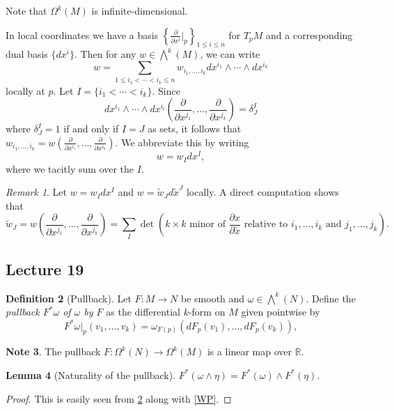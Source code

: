 \documentclass[10pt,letterpaper,cm]{nupset}
\theoremstyle{definition}
\newtheorem{definition}{Definition}[subsection]
\newtheorem{note}[definition]{Note}
\theoremstyle{theorem}
\newtheorem{lemma}[definition]{Lemma}
\theoremstyle{remark}
\newtheorem{remark}[definition]{Remark}
\newcommand{\R}{\mathbb R}
\newcommand{\1}{\mathbf{1}}
\newcommand{\0}{\vec 0}
\begin{document}
Note that $\Omega^k(M)$ is infinite-dimensional. 

\medskip

In local coordinates we have a basis $\left\{\frac{\partial}{\partial{x^i}}\bigr\rvert_p\right\}_{1\leq i \leq n}$ for $T_pM$ and a corresponding dual basis $\{dx^i\}$. Then for any $w \in \bigwedge^k(M)$, we can write $$ w = \sum_{1\leq i_1 < \cdots < i_k \leq n}w_{i_1, \ldots, i_k} dx^{i_1} \wedge \cdots \wedge dx^{i_k} $$ locally at $p$. Let $I =  \{i_1 < \cdots < i_k\}$. Since $$dx^{i_1} \wedge \cdots \wedge dx^{i_l}\left( \frac{\partial}{\partial{x^{j_1}}}, \ldots, \frac{\partial}{\partial{x^{j_k}}} \right) = \delta^I_J$$ where $\delta^I_J = 1$ if and only if $I = J$ as sets, it follows that
$w_{i_1, \ldots, i_k}  = w\left(\frac{\partial}{\partial{x^{i_1}}}, \ldots, \frac{\partial}{\partial{x^{i_k}}}\right).$ We abbreviate this by writing $$w = w_I dx^I,$$ where we tacitly sum over the $I$.


\begin{remark}
Let $w = w_Idx^I$ and $ w= \tilde{w}_J d\tilde{x}^J$ locally. A direct computation shows that $$\tilde{w}_J = w\left(\frac{\partial}{\partial{x^{j_1}}}, \ldots,  \frac{\partial}{\partial{x^{j_k}}}\right) = \sum_I \det(k \times k \text{ minor of }\frac{\partial{x}}{\partial{\tilde{x}}} \text{ relative to } i_1, \ldots, i_k \text{ and }j_1, \ldots, j_k). $$
\end{remark}

\subsection{Lecture 19}

\begin{definition}[Pullback]\label{PB}
Let $F: M \to N$ be smooth and $\omega \in \bigwedge^k(N)$. Define the \textit{pullback $F^{\ast}\omega$ of $\omega$ by $F$} as the differential $k$-form on $M$ given pointwise by $$F^{\ast} \omega\bigr\rvert_p(v_1, \ldots, v_k) = \omega_{F(p)}\left(dF_p(v_1), \ldots, dF_p(v_k)\right),$$
\end{definition}

\begin{note}
The pullback $F : \Omega^k(N) \to \Omega^k(M)$ is a linear map over $\R$. 
\end{note}

\begin{lemma}[Naturality of the pullback]
$F^{\ast}\left(\omega \wedge \eta\right) = F^{\ast}\left(\omega\right) \wedge F^{\ast}\left(\eta\right).$
\end{lemma}
\begin{proof}
This is easily seen from \cref{PB} along with \cref{WP}.
\end{proof}
\end{document}
